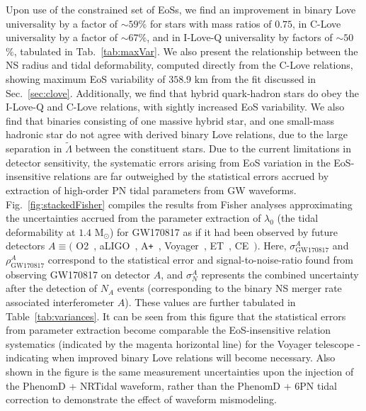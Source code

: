 \documentclass[prd,twocolumn,nofootinbib,superscriptaddress,amsmath,amssymb]{revtex4-1}
\begin{document}
Upon use of the constrained set of EoSs, we find an improvement in binary Love universality by a factor of $\sim 59$\% for stars with mass ratios of $0.75$, in C-Love universality by a factor of $\sim 67\%$, and in I-Love-Q universality by factors of $\sim50$\%, tabulated in Tab.~\ref{tab:maxVar}.
We also present the relationship between the NS radius and tidal deformability, computed directly from the C-Love relations, showing maximum EoS variability of $358.9 \text{ km}$ from the fit discussed in Sec.~\ref{sec:clove}.
Additionally, we find that hybrid quark-hadron stars do obey the I-Love-Q and C-Love relations, with sightly increased EoS variability.
We also find that binaries consisting of one massive hybrid star, and one small-mass hadronic star do not agree with derived binary Love relations, due to the large separation in $\tilde{\Lambda}$ between the constituent stars.
Due to the current limitations in detector sensitivity, the systematic errors arising from EoS variation in the EoS-insensitive relations are far outweighed by the statistical errors accrued by extraction of high-order PN tidal parameters from GW waveforms.
Fig.~\ref{fig:stackedFisher} compiles the results from Fisher analyses approximating the uncertainties accrued from the parameter extraction of $\lambda_0$ (the tidal deformability at $1.4 \text{ M}_{\odot}$) for GW170817 as if it had been observed by future detectors $A \equiv ($ O2~\cite{aLIGO}, aLIGO~\cite{aLIGO}, A\texttt{+}~\cite{Ap_Voyager_CE}, Voyager~\cite{Ap_Voyager_CE}, ET~\cite{ET}, CE~\cite{Ap_Voyager_CE}$)$.
Here, $\sigma^A_{\text{GW170817}}$ and $\rho^A_{\text{GW170817}}$ correspond to the statistical error and signal-to-noise-ratio found from observing GW170817 on detector $A$, and $\sigma^A_N$ represents the combined uncertainty after the detection of $N_A$ events (corresponding to the binary NS merger rate associated interferometer $A$).
These values are further tabulated in Table~\ref{tab:variances}.
It can be seen from this figure that the statistical errors from parameter extraction become comparable the EoS-insensitive relation systematics (indicated by the magenta horizontal line) for the Voyager telescope - indicating when improved binary Love relations will become necessary.
Also shown in the figure is the same measurement uncertainties upon the injection of the PhenomD + NRTidal waveform, rather than the PhenomD + 6PN tidal correction to demonstrate the effect of waveform mismodeling.
\end{document}
